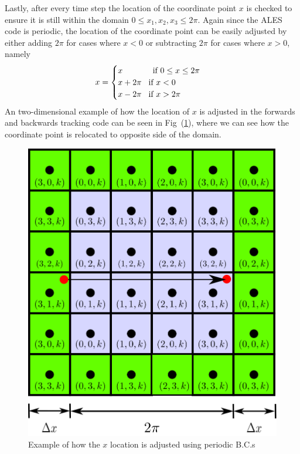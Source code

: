 Lastly, after every time step the location of the coordinate point $x$ is
checked to ensure it is still within the domain $0 \leq x_{1}, x_{2}, x_{3}
\leq 2\pi$. Again since the ALES code is periodic, the location of the
coordinate point can be easily adjusted by either adding $2\pi$ for cases
where $x<0$ or subtracting $2\pi$ for cases where $x>0$, namely
\begin{equation}
    x = 
    \begin{cases}
        x           \text{\hspace{1.3cm}if $ 0 \leq x \leq 2\pi$}  \\
        x + 2\pi    \text{\hspace{0.3cm}if $ x < 0$}  \\
        x - 2\pi    \text{\hspace{0.3cm}if $ x > 2\pi$}     \\
    \end{cases}
\end{equation}
An two-dimensional example of how the location of $x$ is adjusted in the
forwards and backwards tracking code can be seen in
Fig~(\ref{fig:location-adjustment}), where we can see how the coordinate
point is relocated to opposite side of the domain.
\begin{figure}[H]
    \includegraphics[height=0.35\textheight]{media/rk4/location-adjustment}
    \caption{Example of how the $x$ location is adjusted using periodic B.C.s}
    \label{fig:location-adjustment}
\end{figure}

